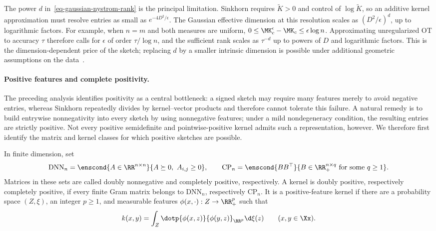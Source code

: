 The power \(d\) in~\eqref{eq-gaussian-nystrom-rank} is the principal limitation. Sinkhorn requires \(\widetilde K>0\) and control of \(\log\widetilde K\), so an additive kernel approximation must resolve entries as small as \(e^{-4D^2/\epsilon}\). The Gaussian effective dimension at this resolution scales as \((D^2/\epsilon)^d\), up to logarithmic factors. For example, when \(n=m\) and both measures are uniform, \(0\leq\MK_c^\epsilon-\MK_c\leq\epsilon\log n\). Approximating unregularized OT to accuracy \(\tau\) therefore calls for \(\epsilon\) of order \(\tau/\log n\), and the sufficient rank scales as \(\tau^{-d}\) up to powers of \(D\) and logarithmic factors. This is the dimension-dependent price of the sketch; replacing \(d\) by a smaller intrinsic dimension is possible under additional geometric assumptions on the data~\cite{AltschulerBachRudiNilesWeed2019NystromSinkhorn}.

\paragraph{Positive features and complete positivity.}
The preceding analysis identifies positivity as a central bottleneck: a signed sketch may require many features merely to avoid negative entries, whereas Sinkhorn repeatedly divides by kernel--vector products and therefore cannot tolerate this failure. A natural remedy is to build entrywise nonnegativity into every sketch by using nonnegative features; under a mild nondegeneracy condition, the resulting entries are strictly positive. Not every positive semidefinite and pointwise-positive kernel admits such a representation, however. We therefore first identify the matrix and kernel classes for which positive sketches are possible.
\begin{defn}\label{def-dnn-cp-kernels}
In finite dimension, set
\[
	\mathrm{DNN}_n=\enscond{A\in\RR^{n\times n}}{A\succeq0,\ A_{i,j}\geq0},
	\qquad
	\mathrm{CP}_n=\enscond{BB^\top}{B\in\RR_+^{n\times q}\hbox{ for some }q\geq1}.
\]
Matrices in these sets are called doubly nonnegative and completely positive, respectively. A kernel is doubly positive, respectively completely positive, if every finite Gram matrix belongs to \(\mathrm{DNN}_n\), respectively \(\mathrm{CP}_n\).
It is a positive-feature kernel if there are a probability space \((Z,\xi)\), an integer \(p\geq1\), and measurable features \(\phi(x,\cdot):Z\to\RR_+^p\) such that
\[
k(x,y)=\int_Z\dotp{\phi(x,z)}{\phi(y,z)}_{\RR^p}\d\xi(z)
\qquad (x,y\in\Xx).
\]
\end{defn}

